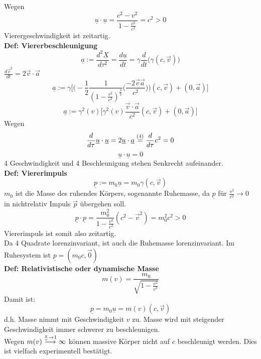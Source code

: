 \documentclass[titlepage,12pt,a4paper,ngerman]{report}
\begin{document}
Wegen
\begin{equation*}
\underline{u} \cdot \underline{u} = \frac{c^2 - v^2}{1 - \frac{v^2}{c^2}} = c^2 > 0 \tag{4}
\end{equation*}
Vierergeschwindigkeit ist zeitartig.\\[5pt]
\textbf{Def: Viererbeschleunigung}
\begin{equation*}
\underline{a} := \frac{d^2 \underline{X}}{d\tau^2} = \frac{d\underline{u}}{dt} = \gamma \frac{d}{dt} \Big(\gamma (c,\vec{v})\Big)
\end{equation*}
$ \frac{d\vec{v}^2}{dt} = 2 \vec{v} \cdot \vec{a} $
\begin{equation*}
\underline{a} := \gamma \bigg[ \Big( -\frac{1}{2} \frac{1}{(1 - \frac{v^2}{c^2})^{\frac{3}{2}}} \Big(\frac{-2 \vec{v} \vec{a}}{c^2}\Big) \Big) (c,\vec{v}) + (0,\vec{a}) \bigg]
\end{equation*}
\begin{equation*}
\underline{a} := \gamma^2 (v) \Big[ \gamma^2(v) \frac{\vec{v} \cdot \vec{a}}{c^2} (c,\vec{v}) + (0,\vec{a}) \Big] \tag{5}
\end{equation*}
Wegen
\begin{equation*}
\frac{d}{d\tau} \underline{u} \cdot \underline{u} = 2 \underline{u} \cdot \underline{a} \buildrel (4) \over = \frac{d}{d\tau} c^2 = 0
\end{equation*}
\begin{equation*}
\underline{u} \cdot \underline{u} = 0 \tag{6}
\end{equation*}
4 Geschwindigkeit und 4 Beschleunigung stehen Senkrecht aufeinander.\\[5pt]
\textbf{Def: Viererimpuls}
\begin{equation*}
\underline{p} := m_0 \underline{u} = m_0 \gamma (c,\vec{v}) \tag{7}
\end{equation*}
$ m_0 $ ist die Masse des ruhendes Körpers, sogenannte Ruhemasse, da $ \underline{p} $ für $ \frac{v^2}{c^2} \rightarrow 0 $ in nichtrelativ Impuls $ \vec{p} $ übergehen soll.
\begin{equation*}
\underline{p} \cdot \underline{p} = \frac{m_0^2}{1-\frac{v^2}{c^2}} (c^2 - \vec{v}^2) = m_0^2 c^2 > 0 \tag{8}
\end{equation*}
Viererimpuls ist somit also zeitartig.\\[5pt]
Da 4 Quadrate lorenzinvariant, ist auch die Ruhemasse lorenzinvariant. Im Ruhesystem ist $ \underline{p} = (m_0 c , \vec{0}) $\\[5pt]
\textbf{Def: Relativistische oder dynamische Masse}
\begin{equation*}
m(v) = \frac{m_0}{\sqrt{1 - \frac{v^2}{c^2}}} \tag{9}
\end{equation*}
Damit ist:
\begin{equation*}
\underline{p} = m_0 \underline{u} = m(v) (c,\vec{v})
\end{equation*}
d.h. Masse nimmt mit Geschwindigkeit $ v $ zu. Masse wird mit steigender Geschwindigkeit immer schwerer zu beschleunigen.\\
Wegen $m(v) \buildrel \frac{v}{c} \rightarrow 1 \over \longrightarrow \infty$ können massive Körper nicht auf $ c $ beschleunigt werden. Dies ist vielfach experimentell bestätigt.
\end{document}
